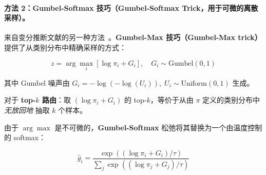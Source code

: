 \paragraph{方法 2：Gumbel-Softmax 技巧（Gumbel-Softmax Trick，用于可微的离散采样）。}
\label{approach-2-gumbel-softmax-trick-for-differentiable-discrete-sampling.}

来自变分推断文献的另一种方法~\cite{jang2017categorical}。\textbf{Gumbel-Max 技巧（Gumbel-Max trick）} 提供了从类别分布中精确采样的方式：

\begin{equation}
  z = \arg\max_i \left[ \log \pi_i + G_i \right], \quad G_i \sim \text{Gumbel}(0,1)
\end{equation}

其中 Gumbel 噪声由 $G_i = -\log(-\log(U_i)),\; U_i \sim \text{Uniform}(0,1)$ 生成。

对于 \textbf{top-$k$ 路由}：取 $(\log \pi_i + G_i)$ 的 top-$k$，等价于从由 $\pi$ 定义的类别分布中 \emph{无放回地} 抽取 $k$ 个样本。

由于 $\arg\max$ 是不可微的，\textbf{Gumbel-Softmax} 松弛将其替换为一个由温度控制的 softmax：

\begin{equation}
  \hat{g}_i = \frac{\exp\left((\log \pi_i + G_i) / \tau\right)}{\sum_j \exp\left((\log \pi_j + G_j) / \tau\right)}
\end{equation}

